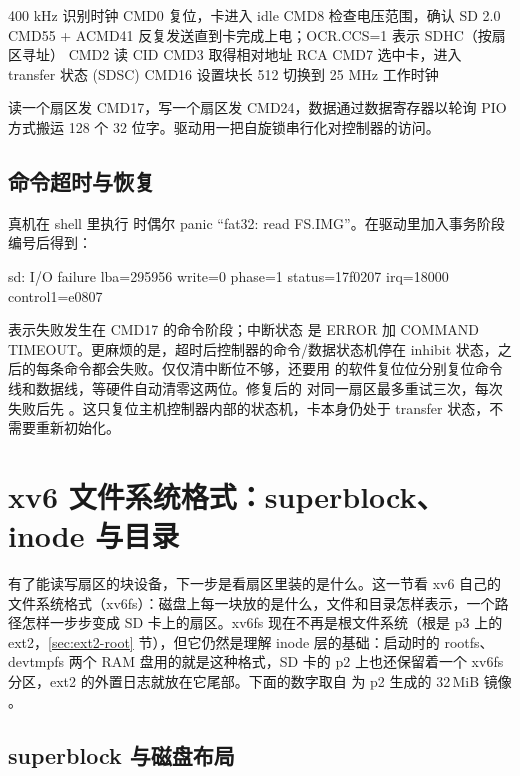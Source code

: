 \begin{txtcode}
400 kHz 识别时钟
CMD0                复位，卡进入 idle
CMD8                检查电压范围，确认 SD 2.0
CMD55 + ACMD41      反复发送直到卡完成上电；OCR.CCS=1 表示 SDHC（按扇区寻址）
CMD2                读 CID
CMD3                取得相对地址 RCA
CMD7                选中卡，进入 transfer 状态
(SDSC) CMD16        设置块长 512
切换到 25 MHz 工作时钟
\end{txtcode}

读一个扇区发 CMD17，写一个扇区发 CMD24，数据通过数据寄存器以轮询 PIO 方式搬运 128 个 32 位字。驱动用一把自旋锁串行化对控制器的访问。

\subsection{命令超时与恢复}

真机在 shell 里执行  时偶尔 panic “fat32: read FS.IMG”。在驱动里加入事务阶段编号后得到：

\begin{txtcode}
sd: I/O failure lba=295956 write=0 phase=1 status=17f0207 irq=18000 control1=e0807
\end{txtcode}

 表示失败发生在 CMD17 的命令阶段；中断状态  是 ERROR 加 COMMAND TIMEOUT。更麻烦的是，超时后控制器的命令/数据状态机停在 inhibit 状态，之后的每条命令都会失败。仅仅清中断位不够，还要用  的软件复位位分别复位命令线和数据线，等硬件自动清零这两位。修复后的  对同一扇区最多重试三次，每次失败后先 。这只复位主机控制器内部的状态机，卡本身仍处于 transfer 状态，不需要重新初始化。

\section{xv6 文件系统格式：superblock、inode 与目录}
\label{sec:xv6fs}
\label{sec:layout}

有了能读写扇区的块设备，下一步是看扇区里装的是什么。这一节看 xv6 自己的文件系统格式（xv6fs）：磁盘上每一块放的是什么，文件和目录怎样表示，一个路径怎样一步步变成 SD 卡上的扇区。xv6fs 现在不再是根文件系统（根是 p3 上的 ext2，\ref{sec:ext2-root} 节），但它仍然是理解 inode 层的基础：启动时的 rootfs、devtmpfs 两个 RAM 盘用的就是这种格式，SD 卡的 p2 上也还保留着一个 xv6fs 分区，ext2 的外置日志就放在它尾部。下面的数字取自  为 p2 生成的 32\,MiB 镜像 。

\subsection{superblock 与磁盘布局}

